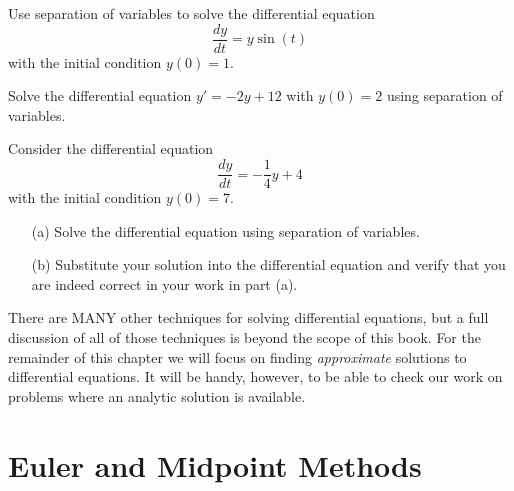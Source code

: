 \begin{problem}
    Use separation of variables to solve the differential equation 
    \[ \frac{dy}{dt} = y\sin(t) \]
    with the initial condition $y(0) = 1$.
\end{problem}

\begin{problem}
    Solve the differential equation $y' = -2y + 12$ with $y(0) = 2$ using separation of
    variables. 
\end{problem}

\begin{problem}
    Consider the differential equation
    \[ \frac{dy}{dt} = -\frac{1}{4} y + 4 \]
    with the initial condition $y(0) = 7$.  
    \begin{enumerate}
        \item[(a)] Solve the differential equation using separation of variables.
        \item[(b)] Substitute your solution into the differential equation and verify that
            you are indeed correct in your work in part (a).
    \end{enumerate}
\end{problem}

There are MANY other techniques for solving differential equations, but a full discussion
of all of those techniques is beyond the scope of this book.  For the remainder of this
chapter we will focus on finding {\it approximate} solutions to differential equations.
It will be handy, however, to be able to check our work on problems where an analytic
solution is available.

\newpage\section{Euler and Midpoint Methods}


